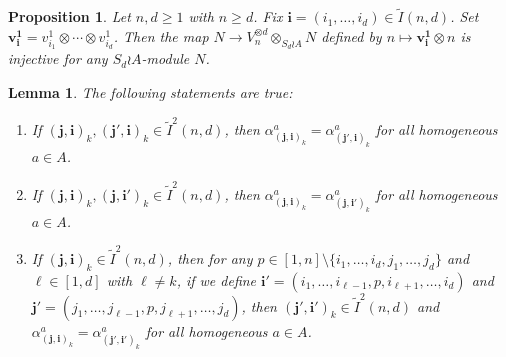 \documentclass[10pt,a4paper]{amsart}
\newtheorem{proposition}{Proposition}
\newtheorem{lemma}{Lemma}
\newcommand{\Itwo}{\tilde{I}^{2}(n,d)}
\newcommand{\SdwreathA}{S_{d} \wreath A}
\newcommand{\bi}{\mathbf{i}}
\newcommand{\bj}{\mathbf{j}}
\newcommand{\bone}{\mathbf{1}}
\newcommand{\bv}{\mathbf{v}}
\newcommand{\tI}{\tilde{I}}
\newcommand{\wreath}{\wr}
\begin{document}
\begin{proposition}\label{T:injective-theorem}
Let $n,d \geq 1$ with $n \geq d$.  Fix $\bi = (i_1,\dotsc , i_d) \in \tI(n,d)$.  Set $\bv^{\bone}_{\bi}=v^{1}_{i_1} \otimes \dotsb  \otimes v^{1}_{i_d}$.  Then the map $N \rightarrow V_{n}^{\otimes d}  \otimes_{\SdwreathA} N$ defined by $n \mapsto \bv^{\bone}_{\bi }  \otimes n$ is injective for any $\SdwreathA$-module $N$.
\end{proposition}

\begin{lemma}  The following statements are true:
\begin{enumerate}
\item If $(\bj, \bi)_{k}, (\bj', \bi)_{k} \in \Itwo$, then $\alpha^{a}_{(\bj , \bi)_{k}}=\alpha^{a}_{(\bj' , \bi)_{k}}$ for all homogeneous $a \in A$.
\item If $(\bj, \bi)_{k}, (\bj, \bi' )_{k} \in \Itwo$, then $\alpha^{a}_{(\bj , \bi)_{k}}=\alpha^{a}_{(\bj , \bi')_{k}}$ for all homogeneous $a \in A$.
\item If $(\bj, \bi)_{k} \in \Itwo$, then for any $p \in [1,n]\setminus \{i_{1}, \dotsc , i_{d}, j_{1}, \dotsc, j_{d} \}$ and $\ell \in [1,d]$ with $\ell \neq k$, if we define $\bi '=(i_{1}, \dotsc , i_{\ell-1}, p, i_{\ell +1}, \dotsc , i_{d})$ and $\bj'=(j_{1}, \dotsc , j_{\ell-1}, p, j_{\ell +1}, \dotsc , j_{d}) $, then $(\bj', \bi' )_{k} \in \Itwo$ and $\alpha^{a}_{(\bj , \bi)_{k}}=\alpha^{a}_{(\bj' , \bi')_{k}}$ for all homogeneous $a \in A$.
\end{enumerate}
\end{lemma}
\end{document}
